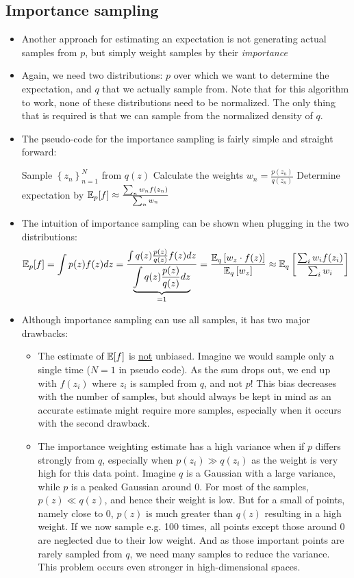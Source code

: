 \subsection{Importance sampling}
\begin{itemize}
	\item Another approach for estimating an expectation is not generating actual samples from $p$, but simply weight samples by their \textit{importance}
	\item Again, we need two distributions: $p$ over which we want to determine the expectation, and $q$ that we actually sample from. Note that for this algorithm to work, none of these distributions need to be normalized. The only thing that is required is that we can sample from the normalized density of $q$.
	\item The pseudo-code for the importance sampling is fairly simple and straight forward: \begin{tcolorbox}[colback=white!80!gray,colframe=gray!75!black,title=Pseudocode for importance sampling]
		\begin{algorithm}[H]
			\SetAlgoLined
			Sample $\left\{z_n\right\}_{n=1}^{N}$ from $q(z)$\;
			Calculate the weights $w_n=\frac{p(z_n)}{q(z_n)}$\;
			Determine expectation by $\mathbb{E}_p[f]\approx \frac{\sum_n w_n f(z_n)}{
			\sum_n w_n}$\;
		\end{algorithm}
	\end{tcolorbox}
	\item The intuition of importance sampling can be shown when plugging in the two distributions:
	$$\mathbb{E}_p[f]=\int p(z)f(z)dz=\frac{\int q(z)\frac{p(z)}{q(z)}f(z)dz}{\underbrace{\int q(z)\frac{p(z)}{q(z)}dz}_{=1}} = \frac{\mathbb{E}_q\left[w_z\cdot f(z)\right]}{\mathbb{E}_q\left[w_z\right]} \approx \mathbb{E}_q\left[\frac{\sum_i w_i f(z_i)}{\sum_i w_i}\right]$$
	\item Although importance sampling can use all samples, it has two major drawbacks:
	\begin{itemize}
		\item The estimate of $\mathbb{E}[f]$ is \underline{not} unbiased. Imagine we would sample only a single time ($N=1$ in pseudo code). As the sum drops out, we end up with $f(z_i)$ where $z_i$ is sampled from $q$, and not $p$! This bias decreases with the number of samples, but should always be kept in mind as an accurate estimate might require more samples, especially when it occurs with the second drawback.
		\item The importance weighting estimate has a high variance when if $p$ differs strongly from $q$, especially when $p(z_i)\gg q(z_i)$ as the weight is very high for this data point. Imagine $q$ is a Gaussian with a large variance, while $p$ is a peaked Gaussian around 0. For most of the samples, $p(z)\ll q(z)$, and hence their weight is low. But for a small of points, namely close to 0, $p(z)$ is much greater than $q(z)$ resulting in a high weight. If we now sample e.g. 100 times, all points except those around 0 are neglected due to their low weight. And as those important points are rarely sampled from $q$, we need many samples to reduce the variance. This problem occurs even stronger in high-dimensional spaces.

\end{itemize}
\end{itemize}
